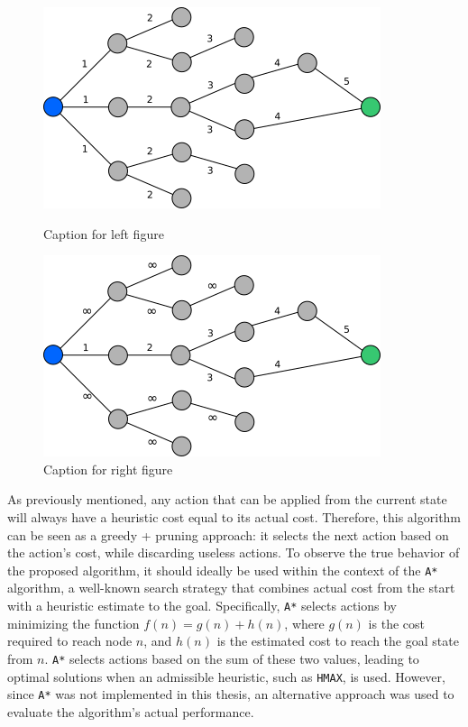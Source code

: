 \begin{figure}[htbp]
	\centering
	\begin{minipage}{0.45\textwidth}
		\centering
		\includegraphics[width=\linewidth]{images/hmax.png}
		\caption{Caption for left figure}
		\label{fig:hmax_scheme}
	\end{minipage}
	\hspace{0.05\textwidth}
	\begin{minipage}{0.45\textwidth}
		\centering
		\includegraphics[width=\linewidth]{images/hmax_pruning.png}
		\caption{Caption for right figure}
		\label{fig:hmax_pruning_scheme}
	\end{minipage}
\end{figure}

As previously mentioned, any action that can be applied from
the current state will always have a heuristic cost equal to its actual cost.
Therefore, this algorithm can be seen as a greedy + pruning approach: it selects the next action based on the action's cost,
while discarding useless actions.
To observe the true behavior of the proposed algorithm, it should ideally be used within the context of the \verb|A*| algorithm,
a well-known search strategy that combines actual cost from the start with a heuristic estimate to the goal.
Specifically, \verb|A*| selects actions by minimizing the function $f(n) = g(n) + h(n)$, where $g(n)$ is the cost
required to reach node $n$, and $h(n)$ is the estimated cost to reach the goal state from $n$.
\verb|A*| selects actions based on the sum of these two values, leading to optimal solutions when an admissible heuristic, such as \verb|HMAX|, is used.
However, since \verb|A*| was not implemented in this thesis, an alternative approach was used to evaluate the algorithm's actual performance.

